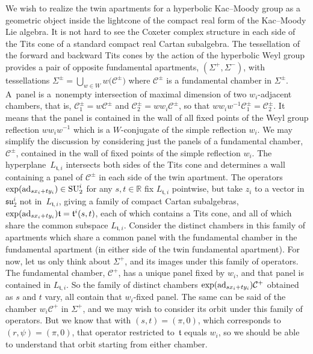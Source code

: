 \documentclass[pdftex]{sigma}
\numberwithin{equation}{section}
\def\R{\mathbb{R}}
\def\cC{\mathcal C}
\def\ft{\mathfrak{t}}
\def\fsu{\mathfrak{su}}
\begin{document}
We wish to realize the twin apartments for a hyperbolic Kac--Moody group as a geometric object inside the lightcone of the compact real form of the Kac--Moody Lie algebra. It is not hard to see the Coxeter complex structure
in each side of the Tits cone of a standard compact real Cartan subalgebra. The tessellation of the forward and backward Tits cones by the action of the hyperbolic Weyl group provides a pair of opposite fundamental apartments, $(\Sigma^+,\Sigma^-)$, with tessellations $\Sigma^\pm = \bigcup\limits_{w\in W} w\big(\cC^\pm\big)$ where $\cC^\pm$ is a fundamental chamber in $\Sigma^\pm$. A~panel is a~nonempty intersection of maximal dimension of two $w_i$-adjacent chambers, that is, $\cC_1^\pm = w\cC^\pm$ and $\cC_2^\pm = w w_i \cC^\pm$, so that $w w_i w^{-1} \cC_1^\pm = \cC_2^\pm$. It means that the panel is contained in the wall of all fixed points of the Weyl group reflection $w w_i w^{-1}$ which is a $W$-conjugate of the simple reflection $w_i$. We may simplify the discussion by considering just the panels of a fundamental chamber, $\cC^\pm$, contained in the wall of fixed points of the simple reflection $w_i$. The hyperplane~$L_{\ft,i}$ intersects both sides of the Tits cone and determines a wall containing a panel of $\cC^\pm$ in each side of the twin apartment. The operators $\exp( {\rm ad}_{sx_i+ty_i})\in {\rm SU}_2^i$ for any $s,t\in\R$ fix $L_{\ft,i}$ pointwise, but take $z_i$ to a vector in $\fsu_2^i$ not in~$L_{\ft,i}$, giving a family of compact Cartan
subalgebras, $\exp( {\rm ad}_{sx_i+ty_i}) \ft = \ft^i(s,t)$, each of which contains a Tits cone, and all of which share the common subspace $L_{\ft,i}$. Consider the distinct chambers in this family of apartments which share a common panel with the fundamental chamber in the fundamental apartment (in either side of the twin fundamental apartment). For now, let us only think about $\Sigma^+$, and its images under this family of operators. The fundamental chamber, $\cC^+$, has a unique panel fixed by $w_i$, and that panel is contained in $L_{\ft,i}$. So the family of distinct chambers $\exp( {\rm ad}_{sx_i+ty_i}) \cC^+$ obtained as $s$ and $t$ vary, all contain that $w_i$-fixed panel. The same can be said of the chamber $w_i \cC^+$ in $\Sigma^+$, and we may wish to consider its orbit under this family of operators. But we know that with $(s,t) = (\pi,0)$, which corresponds to $(r,\psi) = (\pi, 0)$, that operator restricted to~$\ft$
equals $w_i$, so we should be able to understand that orbit starting from either chamber.
\end{document}
